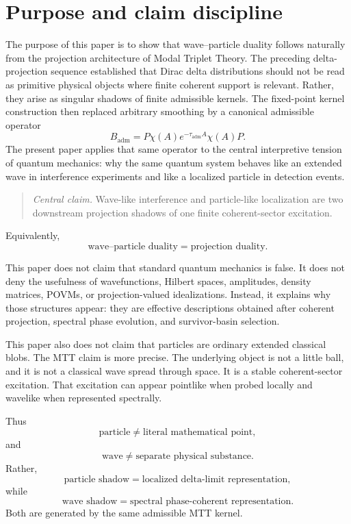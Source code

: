 \documentclass[11pt]{article}
\newcommand{\Badm}{B_{\mathrm{adm}}}
\newcommand{\ta}{\tau_{\mathrm{adm}}}
\begin{document}
\tableofcontents

\section{Purpose and claim discipline}

The purpose of this paper is to show that wave--particle duality follows naturally from
the projection architecture of Modal Triplet Theory. The preceding delta-projection sequence
established that Dirac delta distributions should not be read as primitive physical objects
where finite coherent support is relevant. Rather, they arise as singular shadows of finite
admissible kernels. The fixed-point kernel construction then replaced arbitrary smoothing by
a canonical admissible operator
\begin{equation}
  \Badm
  =
  P\chi(A)e^{-\ta A}\chi(A)P.
  \label{eq:badm}
\end{equation}
The present paper applies that same operator to the central interpretive tension of quantum
mechanics: why the same quantum system behaves like an extended wave in interference
experiments and like a localized particle in detection events.

\begin{quote}
\emph{Central claim.}
Wave-like interference and particle-like localization are two downstream projection shadows
of one finite coherent-sector excitation.
\end{quote}

Equivalently,
\[
  \boxed{\text{wave--particle duality}=\text{projection duality}.}
\]

This paper does not claim that standard quantum mechanics is false. It does not deny the
usefulness of wavefunctions, Hilbert spaces, amplitudes, density matrices, POVMs, or
projection-valued idealizations. Instead, it explains why those structures appear: they are
effective descriptions obtained after coherent projection, spectral phase evolution, and
survivor-basin selection.

This paper also does not claim that particles are ordinary extended classical blobs. The MTT
claim is more precise. The underlying object is not a little ball, and it is not a classical wave
spread through space. It is a stable coherent-sector excitation. That excitation can appear
pointlike when probed locally and wavelike when represented spectrally.

Thus
\[
  \text{particle}\neq \text{literal mathematical point},
\]
and
\[
  \text{wave}\neq \text{separate physical substance}.
\]
Rather,
\[
  \text{particle shadow}
  =
  \text{localized delta-limit representation},
\]
while
\[
  \text{wave shadow}
  =
  \text{spectral phase-coherent representation}.
\]
Both are generated by the same admissible MTT kernel.
\end{document}
